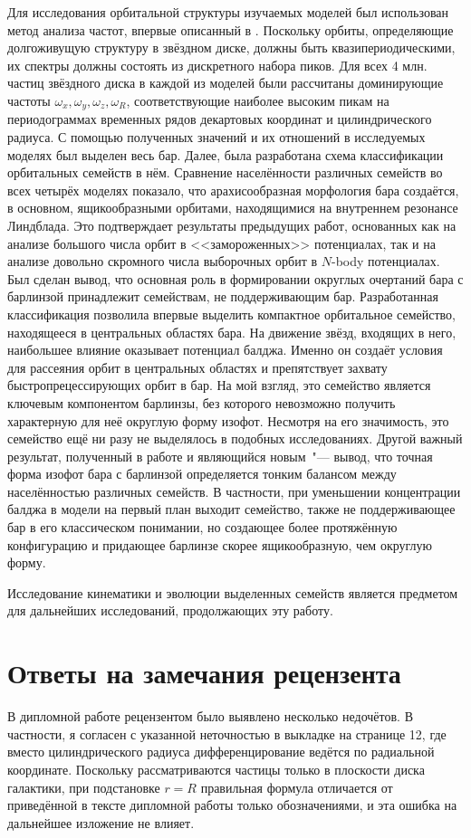 \documentclass[draft]{trnotes}
\begin{document}
Для исследования орбитальной структуры изучаемых моделей был использован метод анализа частот, впервые описанный в \citet{binney1982}.
Поскольку орбиты, определяющие долгоживущую структуру в звёздном диске, должны быть квазипериодическими, их спектры должны состоять из
дискретного набора пиков. Для всех 4 млн. частиц звёздного диска в каждой из моделей были рассчитаны доминирующие частоты
$ω_x, ω_y, ω_z, ω_R$, соответствующие наиболее высоким пикам на периодограммах временных рядов декартовых координат и цилиндрического радиуса. 
С помощью полученных значений и их отношений в исследуемых моделях был выделен весь бар. 
Далее, была разработана схема классификации орбитальных семейств в нём.
Сравнение населённости различных семейств во всех четырёх моделях показало, что арахисообразная морфология бара создаётся, в 
основном, ящикообразными орбитами, находящимися на внутреннем резонансе Линдблада. Это подтверждает результаты предыдущих работ,
основанных как на анализе большого числа орбит в <<замороженных>> потенциалах, так и на анализе довольно скромного числа выборочных орбит в $N$-body потенциалах. Был сделан вывод, что основная роль в формировании округлых очертаний бара с барлинзой принадлежит семействам, не поддерживающим бар. 
Разработанная классификация позволила впервые выделить компактное орбитальное семейство, находящееся в центральных областях бара. 
На движение звёзд, входящих в него, наибольшее влияние оказывает потенциал балджа. 
Именно он создаёт условия для рассеяния орбит в центральных областях и препятствует захвату быстропрецессирующих орбит в бар.
На мой взгляд, это семейство является ключевым компонентом барлинзы, без которого невозможно получить характерную для неё округлую форму изофот.
Несмотря на его значимость, это семейство ещё ни разу не выделялось в подобных исследованиях.
Другой важный результат, полученный в работе и являющийся новым~"--- вывод, что точная форма изофот бара с барлинзой определяется тонким балансом между
населённостью различных семейств. В частности, при уменьшении концентрации балджа в модели на первый план выходит семейство, также не поддерживающее бар в его классическом понимании, но создающее более протяжённую конфигурацию и придающее барлинзе скорее ящикообразную, чем округлую форму. 

Исследование кинематики и эволюции выделенных семейств является предметом для дальнейших исследований, продолжающих эту работу.

\newpage
\section*{\sffamily Ответы на замечания рецензента}
В дипломной работе рецензентом было выявлено несколько недочётов.
В частности, я согласен с указанной неточностью в выкладке на странице 12, где вместо цилиндрического радиуса 
дифференцирование ведётся по радиальной координате. Поскольку рассматриваются частицы только в плоскости диска
галактики, при подстановке $r=R$ правильная формула отличается от приведённой в тексте дипломной работы только
обозначениями, и эта ошибка на дальнейшее изложение не влияет.
\end{document}
